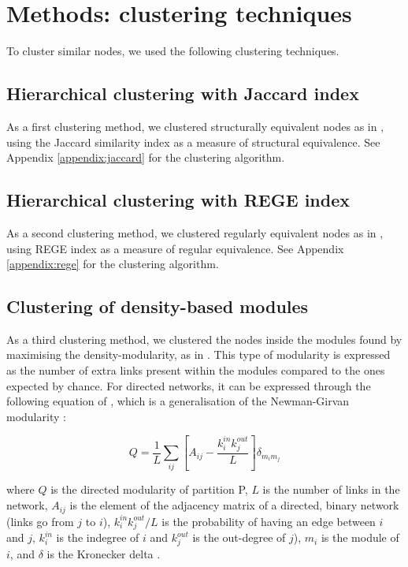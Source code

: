 \documentclass[twocolumn]{article}
\begin{document}
\section*{Methods: clustering techniques}

	To cluster similar nodes, we used the following clustering techniques.

	\subsection*{Hierarchical clustering with Jaccard index}

		As a first clustering method, we clustered structurally equivalent nodes as in \citet{Yodzis1999}, using the Jaccard similarity index as a measure of structural equivalence. See Appendix \ref{appendix:jaccard} for the clustering algorithm.

	\subsection*{Hierarchical clustering with REGE index}

		As a second clustering method, we clustered regularly equivalent nodes as in \citet{Luczkovich2003}, using REGE index as a measure of regular equivalence. See Appendix \ref{appendix:rege} for the clustering algorithm.

	\subsection*{Clustering of density-based modules}

		As a third clustering method, we clustered the nodes inside the modules found by maximising the density-modularity, as in \citet{Guimera2010}. This type of modularity is expressed as the number of extra links present within the modules compared to the ones expected by chance. For directed networks, it can be expressed through the following equation of \citet{Arenas2007}, which is a generalisation of the Newman-Girvan modularity \citep{Newman2004}:

						\begin{equation}
							Q=\frac{1}{L}\sum\limits_{ij}[A_{ij}-\frac{k_i^{in}k_j^{out}}{L}]\delta_{m_im_j} \label{eqn:modularitydensity}
						\end{equation}

		\noindent where $Q$ is the directed modularity of partition P, $L$ is the number of links in the network, $A_{ij}$ is the element of the adjacency matrix of a directed, binary network (links go from $j$ to $i$), $k_i^{in}k_j^{out}/L$ is the probability of having an edge between $i$ and $j$, $k^{in}_i$ is the indegree of $i$ and $k^{out}_j$ is the out-degree of $j$), $ m_i$ is the module of $i$, and $\delta$ is the Kronecker delta \citep{Kozen2007}.
\end{document}

